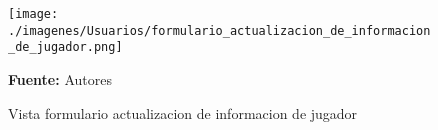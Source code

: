 \begin{figure}[!htb]
  \begin{center}
\texttt{[image: ./imagenes/Usuarios/formulario\_actualizacion\_de\_informacion\_de\_jugador.png]}
    \caption{Vista formulario actualizacion de informacion de jugador}
    \label{fig:Vista_formulario_actualizacion_de_informacion_de_jugador}
    \textbf{Fuente:}  Autores
  \end{center}
\end{figure}
